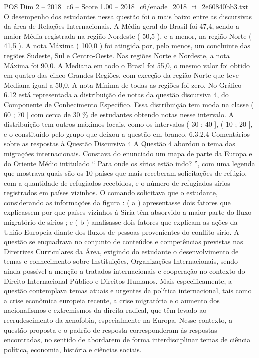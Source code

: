 \begin{textsample}{POS Dim 2 – 2018\_c6 – Score 1.00 – 2018\_c6/enade\_2018\_ri\_2e60840bb3.txt}
O desempenho dos estudantes nessa questão foi o mais baixo entre as discursivas da área de Relações Internacionais.
A Média geral do Brasil foi 47,4, sendo a maior Média registrada na região Nordeste ( 50,5 ), e a menor, na região Norte ( 41,5 ).
A nota Máxima ( 100,0 ) foi atingida por, pelo menos, um concluinte das regiões Sudeste, Sul e Centro-Oeste.
Nas regiões Norte e Nordeste, a nota Máxima foi 90,0.
A Mediana em todo o Brasil foi 55,0, o mesmo valor foi obtido em quatro das cinco Grandes Regiões, com exceção da região Norte que teve Mediana igual a 50,0.
A nota Mínima de todas as regiões foi zero.
No Gráfico 6.12 está representada a distribuição de notas da questão discursiva 4, do Componente de Conhecimento Específico.
Essa distribuição tem moda na classe ( 60 ; 70 ] com cerca de 30 \% de estudantes obtendo notas nesse intervalo.
A distribuição tem outros máximos locais, como os intervalos ( 30 ; 40 ], ( 10 ; 20 ], e o constituído pelo grupo que deixou a questão em branco. 6.3.2.4 Comentários sobre as respostas à Questão Discursiva 4 A Questão 4 abordou o tema das migrações internacionais.
Constava do enunciado um mapa de parte da Europa e do Oriente Médio intitulado “ Para onde os sírios estão indo? ”, com uma legenda que mostrava quais são os 10 países que mais receberam solicitações de refúgio, com a quantidade de refugiados recebidos, e o número de refugiados sírios registrados em países vizinhos.
O comando solicitava que o estudante, considerando as informações da figura : ( a ) apresentasse dois fatores que explicassem por que países vizinhos à Síria têm absorvido a maior parte do fluxo migratório de sírios ; e ( b ) analisasse dois fatores que explicam as ações da União Europeia diante dos fluxos de pessoas provenientes do conflito sírio.
A questão se enquadrava no conjunto de conteúdos e competências previstas nas Diretrizes Curriculares da Área, exigindo do estudante o desenvolvimento de temas e conhecimento sobre Instituições, Organizações Internacionais, sendo ainda possível a menção a tratados internacionais e cooperação no contexto do Direito Internacional Público e Direitos Humanos.
Mais especificamente, a questão contemplava temas atuais e urgentes da política internacional, tais como a crise econômica europeia recente, a crise migratória e o aumento dos nacionalismos e extremismos da direita radical, que têm levado ao recrudescimento da xenofobia, especialmente na Europa.
Nesse contexto, a questão proposta e o padrão de resposta corresponderam às respostas encontradas, no sentido de abordarem de forma interdisciplinar temas de ciência política, economia, história e ciências sociais.

\end{textsample}
